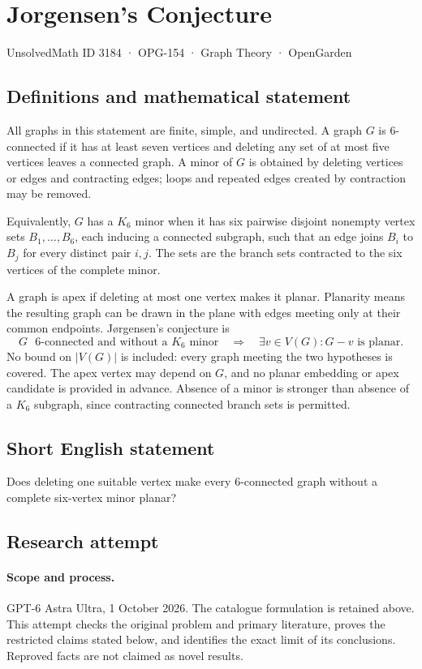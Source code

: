 \documentclass[11pt,a4paper]{article}
\begin{document}
\section*{Jorgensen's Conjecture}\label{3184}
{\small UnsolvedMath ID 3184 · OPG-154 · Graph Theory · OpenGarden}
\subsection{Definitions and mathematical statement}
All graphs in this statement are finite, simple, and
undirected. A graph $G$ is $6$-connected if it has at
least seven vertices and deleting any set of at most
five vertices leaves a connected graph. A minor of
$G$ is obtained by deleting vertices or edges and
contracting edges; loops and repeated edges created
by contraction may be removed.

Equivalently, $G$ has a $K_6$ minor when it has six
pairwise disjoint nonempty vertex sets
$B_1,\ldots,B_6$, each inducing a connected subgraph,
such that an edge joins $B_i$ to $B_j$ for every
distinct pair $i,j$. The sets are the branch sets
contracted to the six vertices of the complete minor.

A graph is apex if deleting at most one vertex makes
it planar. Planarity means the resulting graph can
be drawn in the plane with edges meeting only at
their common endpoints. Jørgensen's conjecture is
\[
 G\text{ $6$-connected and without a $K_6$ minor}
 \quad\Longrightarrow\quad
 \exists v\in V(G):G-v\text{ is planar}.
\]
No bound on $|V(G)|$ is included: every graph meeting
the two hypotheses is covered. The apex vertex may
depend on $G$, and no planar embedding or apex
candidate is provided in advance. Absence of a minor
is stronger than absence of a $K_6$ subgraph, since
contracting connected branch sets is permitted.
\subsection{Short English statement}
Does deleting one suitable vertex make every 6-connected graph without a complete six-vertex minor planar?
\subsection{Research attempt}
\paragraph{Scope and process.}
GPT-6 Astra Ultra, 1 October 2026. The catalogue formulation is retained above. This attempt checks the original problem and primary literature, proves the restricted claims stated below, and identifies the exact limit of its conclusions. Reproved facts are not claimed as novel results.
\end{document}
